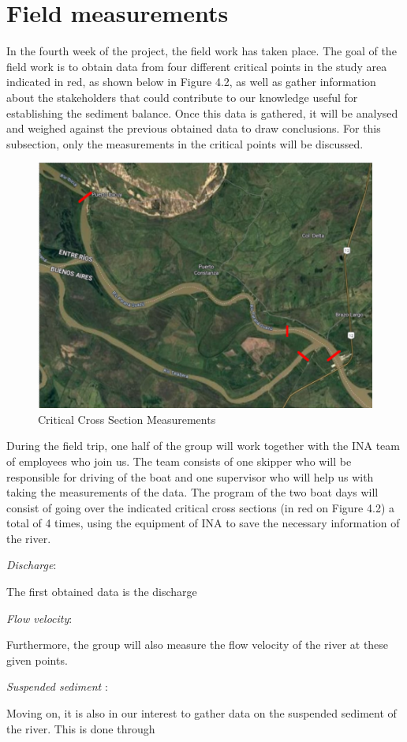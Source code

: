 \section{Field measurements}
In the fourth week of the project, the field work has taken place. The goal of the field work is to obtain data from four different critical points in the study area indicated in red, as shown below in Figure 4.2, as well as gather information about the stakeholders that could contribute to our knowledge useful for establishing the sediment balance. Once this data is gathered, it will be analysed and weighed against the previous obtained data to draw conclusions. For this subsection, only the measurements in the critical points will be discussed.
\begin{figure}[H]
    \centering
    \includegraphics[width=0.5\linewidth]{figures/ch4/Critical measurement points.png}
    \caption{Critical Cross Section Measurements}
    \label{fig:fieldwork cross sections}
\end{figure}
During the field trip, one half of the group will work together with the INA team of employees who join us. The team consists of one skipper who will be responsible for driving of the boat and one supervisor who will help us with taking the measurements of the data.
The program of the two boat days will consist of going over the indicated critical cross sections (in red on Figure 4.2) a total of 4 times, using the equipment of INA to save the necessary information of the river.

\textit{Discharge}:

The first obtained data is the discharge 

\textit{Flow velocity}:

Furthermore, the group will also measure the flow velocity of the river at these given points.

\textit{Suspended sediment }:

Moving on, it is also in our interest to gather data on the suspended sediment of the river. This is done through 

